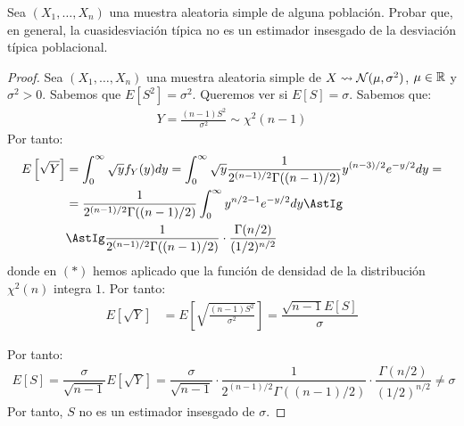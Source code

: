 \begin{ejemplo}
    Sea $(X_1, \ldots, X_n)$ una muestra aleatoria simple de alguna población. Probar que, en general, la cuasidesviación típica no es un estimador insesgado de la desviación típica poblacional.
    \begin{proof}
        Sea $(X_1, \ldots, X_n)$ una muestra aleatoria simple de $X\rightsquigarrow \mathcal{N}(\mu, \sigma^2)$, $\mu \in \mathbb{R}$ y $\sigma^2 > 0$. Sabemos que $E[S^2] = \sigma^2$. Queremos ver si $E[S] = \sigma$. Sabemos que:
        \begin{align*}
            Y = \frac{(n-1)S^2}{\sigma^2} \sim \chi^2(n-1)
        \end{align*}
        Por tanto:
        \begin{align*}
            E\left[\sqrt{Y}\right] &= \int_0^\infty \sqrt{y} f_Y(y) dy = \int_0^\infty \sqrt{y}\dfrac{1}{2^{(n-1)/2}\Gamma((n-1)/2)} y^{(n-3)/2} e^{-y/2} dy
            =\\&= \dfrac{1}{2^{(n-1)/2}\Gamma((n-1)/2)} \int_0^\infty y^{n/2-1} e^{-y/2} dy
            \AstIg\\&\AstIg \dfrac{1}{2^{(n-1)/2}\Gamma((n-1)/2)} \cdot \dfrac{\Gamma(n/2)}{(1/2)^{n/2}}
        \end{align*}
        donde en $(\ast)$ hemos aplicado que la función de densidad de la distribución $\chi^2(n)$ integra $1$. Por tanto:
        \begin{align*}
            E[\sqrt{Y}] &= E\left[\sqrt{\frac{(n-1)S^2}{\sigma^2}}\right] = \dfrac{\sqrt{n-1}E[S]}{\sigma}
        \end{align*}

        Por tanto:
        \begin{align*}
            E[S] = \dfrac{\sigma}{\sqrt{n-1}} E[\sqrt{Y}] = \dfrac{\sigma}{\sqrt{n-1}} \cdot \dfrac{1}{2^{(n-1)/2}\Gamma((n-1)/2)} \cdot \dfrac{\Gamma(n/2)}{(1/2)^{n/2}}
            \neq \sigma
        \end{align*}
        Por tanto, $S$ no es un estimador insesgado de $\sigma$.
    \end{proof}
\end{ejemplo}

